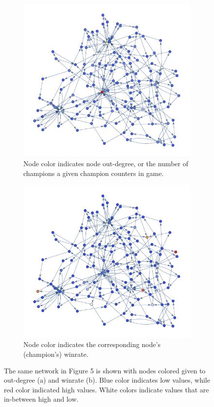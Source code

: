 \documentclass[twoside]{article}
\begin{document}
\begin{multicols}{2}
\begin{figure}
\centering
\begin{subfigure}{.5\textwidth}
  \centering
  \includegraphics[width=1\linewidth]{outdegree.pdf}
  \caption{Node color indicates node out-degree, or the number of champions a given champion counters in game.}
  \label{fig:sub1}
\end{subfigure}%
\begin{subfigure}{.5\textwidth}
  \centering
  \includegraphics[width=1\linewidth]{prepop.pdf}
  \caption{Node color indicates the corresponding node's (champion's) winrate.}
  \label{fig:sub2}
\end{subfigure}
\caption{The same network in Figure 5 is shown with nodes colored given to out-degree (a) and winrate (b). Blue color indicates low values, while red color indicated high values. White colors indicate values that are in-between high and low.}
\label{fig:test}
\end{figure}


\end{multicols}
\end{document}
